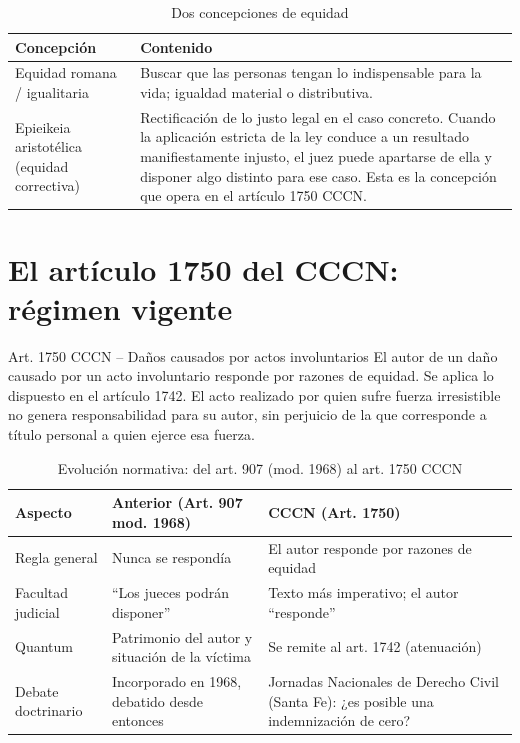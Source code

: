 \documentclass[12pt,oneside]{book}
\begin{document}
\begin{table}[H]
\centering
\caption{Dos concepciones de equidad}
\begin{tabularx}{\textwidth}{l X}
\toprule
\textbf{Concepción} & \textbf{Contenido} \\
\midrule
Equidad romana / igualitaria & Buscar que las personas tengan lo indispensable para la vida; igualdad material o distributiva. \\
Epieikeia aristotélica (equidad correctiva) & Rectificación de lo justo legal en el caso concreto. Cuando la aplicación estricta de la ley conduce a un resultado manifiestamente injusto, el juez puede apartarse de ella y disponer algo distinto para ese caso. Esta es la concepción que opera en el artículo 1750 CCCN. \\
\bottomrule
\end{tabularx}
\end{table}

\section{El artículo 1750 del CCCN: régimen vigente}

\begin{definition}{Art. 1750 CCCN -- Daños causados por actos involuntarios}
El autor de un daño causado por un acto involuntario responde por razones de equidad. Se aplica lo dispuesto en el artículo 1742. El acto realizado por quien sufre fuerza irresistible no genera responsabilidad para su autor, sin perjuicio de la que corresponde a título personal a quien ejerce esa fuerza.
\end{definition}

\begin{table}[H]
\centering
\caption{Evolución normativa: del art. 907 (mod. 1968) al art. 1750 CCCN}
\begin{tabularx}{\textwidth}{l X X}
\toprule
\textbf{Aspecto} & \textbf{Anterior (Art. 907 mod. 1968)} & \textbf{CCCN (Art. 1750)} \\
\midrule
Regla general & Nunca se respondía & El autor responde por razones de equidad \\
Facultad judicial & ``Los jueces podrán disponer'' & Texto más imperativo; el autor ``responde'' \\
Quantum & Patrimonio del autor y situación de la víctima & Se remite al art. 1742 (atenuación) \\
Debate doctrinario & Incorporado en 1968, debatido desde entonces & Jornadas Nacionales de Derecho Civil (Santa Fe): ¿es posible una indemnización de cero? \\
\bottomrule
\end{tabularx}
\end{table}
\end{document}
